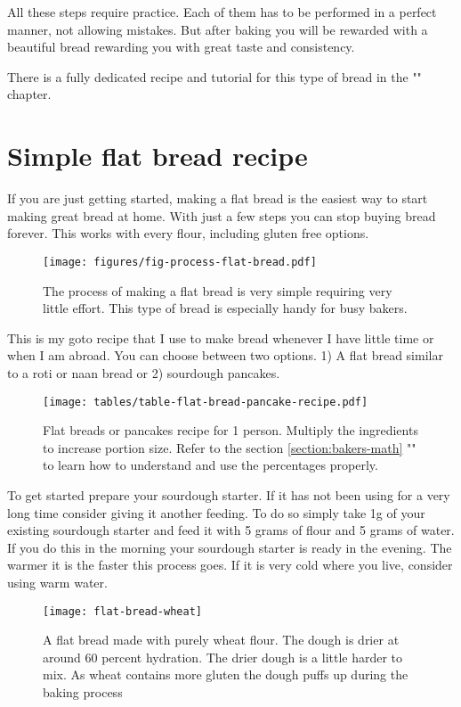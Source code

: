All these steps require practice. Each of them has to be
performed in a perfect manner, not allowing mistakes.
But after baking you will be rewarded with a beautiful bread
rewarding you with great taste and consistency.

There is a fully dedicated recipe and tutorial
for this type of bread in the "" chapter.

\section{Simple flat bread recipe}
\label{section:flat-bread-recipe}

If you are just getting started, making a flat bread is the
easiest way to start making great bread at home. With just a
few steps you can stop buying bread forever. This works with
every flour, including gluten free options.

\begin{figure}[!htb]
  \texttt{[image: figures/fig-process-flat-bread.pdf]}
  \caption{The process of making a flat bread is very simple requiring very little effort. This
  type of bread is especially handy for busy bakers.}
  \label{fig:flat-bread-process}
\end{figure}

This is my goto recipe that I use to make bread whenever
I have little time or when I am abroad. You can choose
between two options. 1) A flat bread similar to a roti or naan bread
or 2) sourdough pancakes.

\begin{figure}[!htb]
  \texttt{[image: tables/table-flat-bread-pancake-recipe.pdf]}
  \caption{\label{tab:flat-bread-ingredients}Flat breads or pancakes recipe for 1 person. Multiply the ingredients
  to increase portion size. Refer to the section \ref{section:bakers-math} "" to learn how
  to understand and use the percentages properly.} 
\end{figure}

To get started prepare your sourdough starter. If it has not been using for a very
long time consider giving it another feeding. To do so simply take 1g of your
existing sourdough starter and feed it with 5 grams of flour and 5 grams of water.
If you do this in the morning your sourdough starter is ready in the evening. The
warmer it is the faster this process goes. If it is very cold where you live, consider
using warm water.

\begin{figure}[htb!]
  \texttt{[image: flat-bread-wheat]}
  \centering
  \caption{A flat bread made with purely wheat flour. The dough is drier
  at around 60 percent hydration.  The drier dough is a little harder
  to mix. As wheat contains more gluten the dough puffs up during
  the baking process}
\end{figure}

